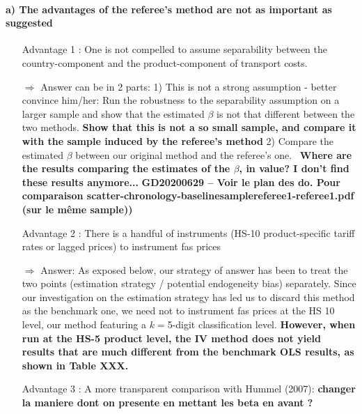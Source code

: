 \documentclass[a4paper,12pt]{article}
\begin{document}
\paragraph{a) The advantages of the referee's method are not as important as suggested}
\begin{itemize}
\item[Advantage 1]: One is not compelled to assume separability between the country-component and the product-component of transport costs.
\item[$\Rightarrow$] Answer can be in 2 parts: 1) This is not a strong assumption - better convince him/her: Run the robustness to the separability assumption on a larger sample and show that the estimated $\beta$ is not that different between the two methods. \textbf{Show that this is not a so small sample, and compare it with the sample induced by the referee's method} 2) Compare the estimated $\beta$ between our original method and the referee's one. \
\textbf{Where are the results comparing the estimates of the $\beta$, in value? I don't find these results anymore...}
\textbf{GD20200629 -- Voir le plan des do. Pour comparaison scatter-chronology-baselinesamplereferee1-referee1.pdf (sur le même sample))}


\item[Advantage 2]: There is a handful of instruments (HS-10 product-specific tariff rates or lagged prices) to instrument fas prices
\item[$\Rightarrow$] Answer: As exposed below, our strategy of answer has been to treat the two points (estimation strategy / potential endogeneity bias) separately. Since our investigation on the estimation strategy has led us to discard this method as the benchmark one, we need not to instrument fas prices at the HS 10 level, our method featuring a $k=$5-digit classification level. \textbf{However, when run at the HS-5 product level, the IV method does not yield results that are much different from the benchmark OLS results, as shown in Table XXX.}

\item[Advantage 3]: A more transparent comparison with Hummel (2007): \textbf{changer la maniere dont on presente en mettant les beta en avant ?}
\end{itemize}
\end{document}
